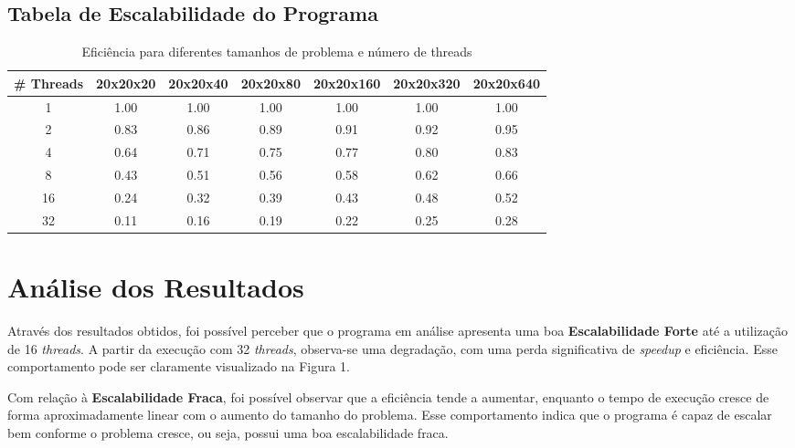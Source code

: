 \documentclass[a4paper, 12pt]{article}
\begin{document}
	 \subsection{Tabela de Escalabilidade do Programa}
	 \begin{table}[H]
	 	\centering
	 	\begin{tabular}{|c|c|c|c|c|c|c|}
	 		\hline
	 		\textbf{\# Threads} & \textbf{20x20x20} & \textbf{20x20x40} & \textbf{20x20x80} & \textbf{20x20x160} & \textbf{20x20x320} & \textbf{20x20x640} \\ \hline
	 		1 & \cellcolor{yellow!20} 1.00 & 1.00 & 1.00 & 1.00 & 1.00 & 1.00 \\ \hline
	 		2 & 0.83 & \cellcolor{yellow!20}0.86 & 0.89 & 0.91 & 0.92 & 0.95 \\ \hline
	 		4 & 0.64 & 0.71 & \cellcolor{yellow!20} 0.75 & 0.77 & 0.80 & 0.83 \\ \hline
	 		8 & 0.43 & 0.51 & 0.56 & \cellcolor{yellow!20} 0.58 & 0.62 & 0.66 \\ \hline
	 		16 & 0.24 & 0.32 & 0.39 & 0.43 & \cellcolor{yellow!20} 0.48 & 0.52 \\ \hline
	 		32 & 0.11 & 0.16 & 0.19 & 0.22 & 0.25 & \cellcolor{yellow!20} 0.28 \\ \hline
	 	\end{tabular}
	 	\caption{Eficiência para diferentes tamanhos de problema e número de threads}
	 \end{table}
	 
	 \section{Análise dos Resultados}
	 
	 \hspace{0.68cm}Através dos resultados obtidos, foi possível perceber que o programa em análise apresenta uma boa \textbf{Escalabilidade Forte} até a utilização de 16 \textit{threads}. A partir da execução com 32 \textit{threads}, observa-se uma degradação, com uma perda significativa de \textit{speedup} e eficiência. Esse comportamento pode ser claramente visualizado na Figura 1.
	 
	 Com relação à \textbf{Escalabilidade Fraca}, foi possível observar que a eficiência tende a aumentar, enquanto o tempo de execução cresce de forma aproximadamente linear com o aumento do tamanho do problema. Esse comportamento indica que o programa é capaz de escalar bem conforme o problema cresce, ou seja, possui uma boa escalabilidade fraca.
	 
\end{document}
